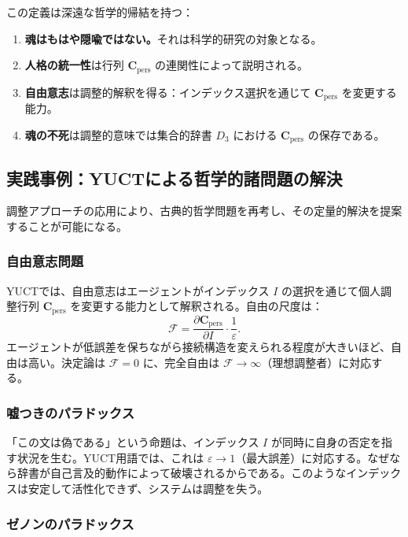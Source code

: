 \documentclass[11pt,a4paper]{article}
\newcommand{\eps}{\varepsilon}
\newcommand{\Cpers}{\mathbf{C}_{\text{pers}}}
\begin{document}
	この定義は深遠な哲学的帰結を持つ：
	
	\begin{enumerate}
		\item \textbf{魂はもはや隠喩ではない。}それは科学的研究の対象となる。
		\item \textbf{人格の統一性}は行列 \(\Cpers\) の連関性によって説明される。
		\item \textbf{自由意志}は調整的解釈を得る：インデックス選択を通じて \(\Cpers\) を変更する能力。
		\item \textbf{魂の不死}は調整的意味では集合的辞書 \(D_3\) における \(\Cpers\) の保存である。
	\end{enumerate}
	
	\subsection{実践事例：YUCTによる哲学的諸問題の解決}
	\label{sec:practical-cases}
	
	調整アプローチの応用により、古典的哲学問題を再考し、その定量的解決を提案することが可能になる。
	
	\subsubsection{自由意志問題}
	
	YUCTでは、自由意志はエージェントがインデックス \(I\) の選択を通じて個人調整行列 \(\Cpers\) を変更する能力として解釈される。自由の尺度は：
	\[
	\mathcal{F} = \frac{\partial \Cpers}{\partial I} \cdot \frac{1}{\eps}.
	\]
	エージェントが低誤差を保ちながら接続構造を変えられる程度が大きいほど、自由は高い。決定論は \(\mathcal{F} = 0\) に、完全自由は \(\mathcal{F} \to \infty\)（理想調整者）に対応する。
	
	\subsubsection{嘘つきのパラドックス}
	
	「この文は偽である」という命題は、インデックス \(I\) が同時に自身の否定を指す状況を生む。YUCT用語では、これは \(\eps \to 1\)（最大誤差）に対応する。なぜなら辞書が自己言及的動作によって破壊されるからである。このようなインデックスは安定して活性化できず、システムは調整を失う。
	
	\subsubsection{ゼノンのパラドックス}
	
\end{document}
